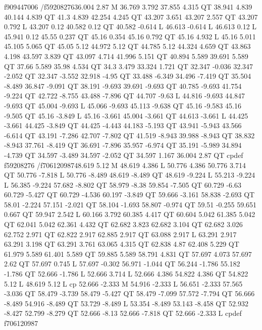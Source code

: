 f909447006
/f59208276{36.004 2.87 M
36.769 3.792 37.855 4.315 QT
38.941 4.839 40.144 4.839 QT
41.3 4.839 42.254 4.245 QT
43.207 3.651 43.207 2.557 QT
43.207 0.792 L
43.207 0.12 40.582 0.12 QT
40.582 -0.614 L
46.613 -0.614 L
46.613 0.12 L
45.941 0.12 45.55 0.237 QT
45.16 0.354 45.16 0.792 QT
45.16 4.932 L
45.16 5.011 45.105 5.065 QT
45.05 5.12 44.972 5.12 QT
44.785 5.12 44.324 4.659 QT
43.863 4.198 43.597 3.839 QT
43.097 4.714 41.996 5.151 QT
40.894 5.589 39.691 5.589 QT
37.66 5.589 35.98 4.534 QT
34.3 3.479 33.324 1.721 QT
32.347 -0.036 32.347 -2.052 QT
32.347 -3.552 32.918 -4.95 QT
33.488 -6.349 34.496 -7.419 QT
35.504 -8.489 36.847 -9.091 QT
38.191 -9.693 39.691 -9.693 QT
40.785 -9.693 41.754 -9.224 QT
42.722 -8.755 43.488 -7.896 QT
44.707 -9.63 L
44.816 -9.693 44.847 -9.693 QT
45.004 -9.693 L
45.066 -9.693 45.113 -9.638 QT
45.16 -9.583 45.16 -9.505 QT
45.16 -3.849 L
45.16 -3.661 45.004 -3.661 QT
44.613 -3.661 L
44.425 -3.661 44.425 -3.849 QT
44.425 -4.443 44.183 -5.193 QT
43.941 -5.943 43.566 -6.614 QT
43.191 -7.286 42.707 -7.802 QT
41.519 -8.943 39.988 -8.943 QT
38.832 -8.943 37.761 -8.419 QT
36.691 -7.896 35.957 -6.974 QT
35.191 -5.989 34.894 -4.739 QT
34.597 -3.489 34.597 -2.052 QT
34.597 1.167 36.004 2.87 QT
cp}def
f59208276
/f706120987{48.619 5.12 M
48.619 4.386 L
50.776 4.386 50.776 3.714 QT
50.776 -7.818 L
50.776 -8.489 48.619 -8.489 QT
48.619 -9.224 L
55.213 -9.224 L
56.385 -9.224 57.682 -8.802 QT
58.979 -8.38 59.854 -7.505 QT
60.729 -6.63 60.729 -5.427 QT
60.729 -4.536 60.197 -3.849 QT
59.666 -3.161 58.838 -2.693 QT
58.01 -2.224 57.151 -2.021 QT
58.104 -1.693 58.807 -0.974 QT
59.51 -0.255 59.651 0.667 QT
59.947 2.542 L
60.166 3.792 60.385 4.417 QT
60.604 5.042 61.385 5.042 QT
62.041 5.042 62.361 4.432 QT
62.682 3.823 62.682 3.104 QT
62.682 3.026 62.752 2.971 QT
62.822 2.917 62.885 2.917 QT
63.088 2.917 L
63.291 2.917 63.291 3.198 QT
63.291 3.761 63.065 4.315 QT
62.838 4.87 62.408 5.229 QT
61.979 5.589 61.401 5.589 QT
59.885 5.589 58.791 4.831 QT
57.697 4.073 57.697 2.62 QT
57.697 0.745 L
57.697 -0.302 56.971 -1.044 QT
56.244 -1.786 55.182 -1.786 QT
52.666 -1.786 L
52.666 3.714 L
52.666 4.386 54.822 4.386 QT
54.822 5.12 L
48.619 5.12 L
cp
52.666 -2.333 M
54.916 -2.333 L
56.651 -2.333 57.565 -3.036 QT
58.479 -3.739 58.479 -5.427 QT
58.479 -7.099 57.572 -7.794 QT
56.666 -8.489 54.916 -8.489 QT
53.729 -8.489 L
53.354 -8.489 53.143 -8.458 QT
52.932 -8.427 52.799 -8.279 QT
52.666 -8.13 52.666 -7.818 QT
52.666 -2.333 L
cp}def
f706120987
